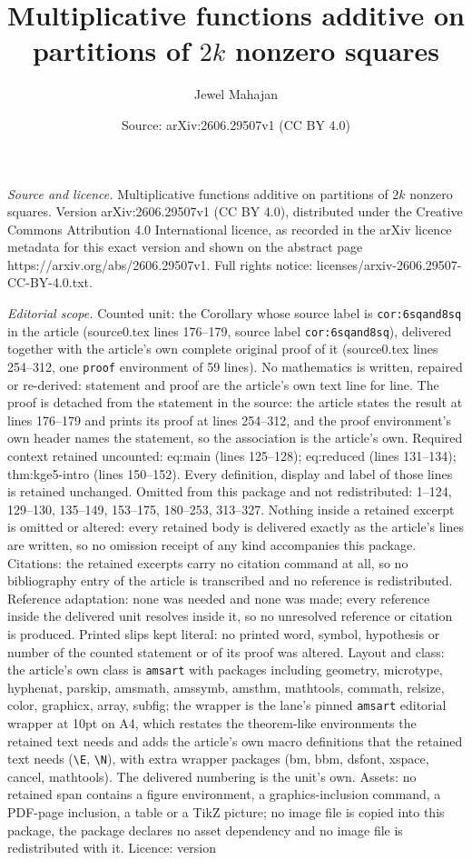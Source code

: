 \documentclass[10pt,a4paper]{amsart}
\title[Multiplicative functions additive on partitions of $2k$ nonz]{Multiplicative functions additive on partitions of $2k$ nonzero squares}
\author{Jewel Mahajan}
\date{Source: arXiv:2606.29507v1 (CC BY 4.0)}
\begin{document}
\maketitle

\noindent\emph{Source and licence.} Multiplicative functions additive on partitions of $2k$ nonzero squares. Version arXiv:2606.29507v1 (CC BY 4.0), distributed under the Creative Commons Attribution 4.0 International licence, as recorded in the arXiv licence metadata for this exact version and shown on the abstract page https://arxiv.org/abs/2606.29507v1. Full rights notice: licenses/arxiv-2606.29507-CC-BY-4.0.txt.\par\smallskip

\noindent\textit{Editorial scope.} Counted unit: the Corollary whose source label is \texttt{cor:6sqand8sq} in the article (source0.tex lines 176--179, source label \texttt{cor:6sqand8sq}), delivered together with the article's own complete original proof of it (source0.tex lines 254--312, one \texttt{proof} environment of 59 lines). No mathematics is written, repaired or re-derived: statement and proof are the article's own text line for line. The proof is detached from the statement in the source: the article states the result at lines 176--179 and prints its proof at lines 254--312, and the proof environment's own header names the statement, so the association is the article's own. Required context retained uncounted: eq:main (lines 125--128); eq:reduced (lines 131--134); thm:kge5-intro (lines 150--152). Every definition, display and label of those lines is retained unchanged. Omitted from this package and not redistributed: 1--124, 129--130, 135--149, 153--175, 180--253, 313--327. Nothing inside a retained excerpt is omitted or altered: every retained body is delivered exactly as the article's lines are written, so no omission receipt of any kind accompanies this package. Citations: the retained excerpts carry no citation command at all, so no bibliography entry of the article is transcribed and no reference is redistributed. Reference adaptation: none was needed and none was made; every reference inside the delivered unit resolves inside it, so no unresolved reference or citation is produced. Printed slips kept literal: no printed word, symbol, hypothesis or number of the counted statement or of its proof was altered. Layout and class: the article's own class is \texttt{amsart} with packages including geometry, microtype, hyphenat, parskip, amsmath, amssymb, amsthm, mathtools, commath, relsize, color, graphicx, array, subfig; the wrapper is the lane's pinned \texttt{amsart} editorial wrapper at 10pt on A4, which restates the theorem-like environments the retained text needs and adds the article's own macro definitions that the retained text needs (\texttt{\textbackslash E}, \texttt{\textbackslash N}), with extra wrapper packages (bm, bbm, dsfont, xspace, cancel, mathtools). The delivered numbering is the unit's own. Assets: no retained span contains a figure environment, a graphics-inclusion command, a PDF-page inclusion, a table or a TikZ picture; no image file is copied into this package, the package declares no asset dependency and no image file is redistributed with it. Licence: version 
\end{document}
